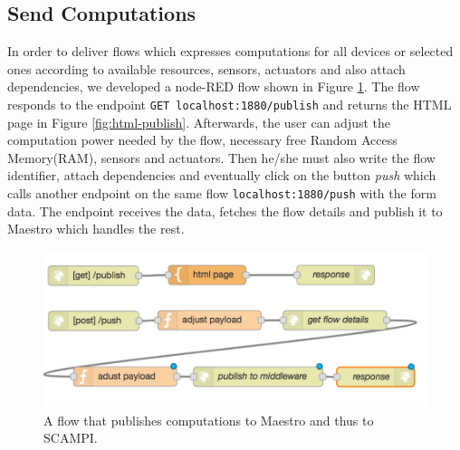 \subsection{Send Computations}\label{subsec:send-comp}
In order to deliver flows which expresses computations for all devices or selected ones according to available resources,  sensors, actuators and also attach dependencies, we developed a node-RED flow shown in Figure \ref{fig:flow-publish-computation}. The flow responds to the endpoint \verb|GET localhost:1880/publish| and returns the HTML page in Figure \ref{fig:html-publish}. Afterwards, the user can adjust the computation power needed by the flow, necessary free Random Access Memory(RAM), sensors and actuators. Then he/she must also write the flow identifier, attach dependencies and eventually click on the button \textit{push} which calls another endpoint on the same flow \verb|localhost:1880/push| with the form data. The endpoint receives the data, fetches the flow details and publish it to  Maestro which handles the rest.
 \begin{figure}[H]
	\centering
	\includegraphics[scale=0.6]{images/flow-publish-computation.png}
	\caption{A flow that publishes computations to Maestro and thus to SCAMPI.}
	\label{fig:flow-publish-computation}
\end{figure}


